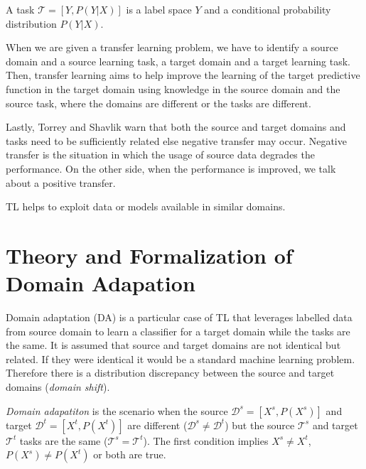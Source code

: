 \begin{definition}
	A task \(\mathcal{T} = [Y, P(Y | X)]\)
	is a label space \(Y\)
	and a conditional probability distribution \(P(Y | X)\).~\cite{pan2010}
\end{definition}

When we are given a transfer learning problem,
we have to identify a source domain and a source learning task,
a target domain and a target learning task.
Then, transfer learning aims to help improve the learning of the target predictive function in the target domain using knowledge in the source domain and the source task,
where the domains are different or the tasks are different.~\cite{pan2010}

Lastly, Torrey and Shavlik warn that both the source and target domains and tasks need to be sufficiently related
else negative transfer may occur.
Negative transfer is the situation in which the usage of source data degrades the performance.
On the other side, when the performance is improved,
we talk about a positive transfer.~\cite{torrey2010}

TL helps to exploit data or models available in similar domains.~\cite{csurka2017}

\section{Theory and Formalization of Domain Adapation}

Domain adaptation (DA) is a particular case of TL
that leverages labelled data from source domain to learn a classifier for a target domain while the tasks are the same.
It is assumed that source and target domains are not identical but related.
If they were identical it would be a standard machine learning problem.
Therefore there is a distribution discrepancy between the source and target domains (\textit{domain shift}).~\cite{csurka2017}

\begin{definition}
	\textit{Domain adapatiton} is the scenario when the source
	\(\mathcal{D}^s = [X^s, P(X^s)]\)
	and target \(\mathcal{D}^t = [X^t, P(X^t)]\)
	are different (\(\mathcal{D}^s \ne \mathcal{D}^t\))
	but the source \(\mathcal{T}^s\) and target \(\mathcal{T}^t\)
	tasks are the same (\(\mathcal{T}^s = \mathcal{T}^t\)).
	The first condition implies \(X^s \ne X^t\),
	\(P(X^s) \ne P(X^t)\) or both are true.~\cite{pan2010}
\end{definition}


